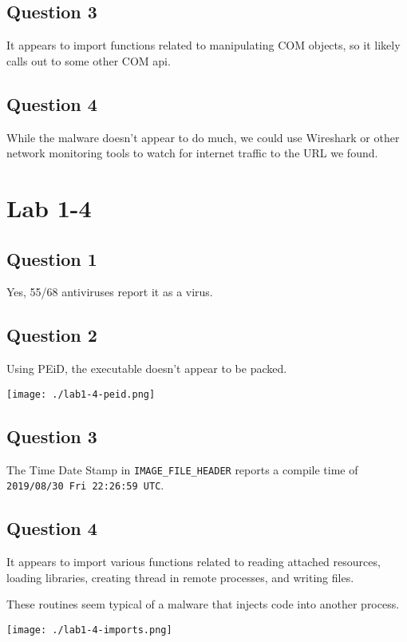 \documentclass[11pt]{article}
\begin{document}
\subsection{Question 3}
\label{sec:orgb028669}
It appears to import functions related to manipulating COM objects, so
it likely calls out to some other COM api.
\subsection{Question 4}
\label{sec:org6b0e262}
While the malware doesn't appear to do much, we could use Wireshark or
other network monitoring tools to watch for internet traffic to the
URL we found.
\section{Lab 1-4}
\label{sec:org75c0b34}
\subsection{Question 1}
\label{sec:org28dc5c8}
Yes, 55/68 antiviruses report it as a virus.
\subsection{Question 2}
\label{sec:orgc9357f0}
Using PEiD, the executable doesn't appear to be packed.

\begin{center}
\texttt{[image: ./lab1-4-peid.png]}
\end{center}
\subsection{Question 3}
\label{sec:orgc985e00}
The Time Date Stamp in \texttt{IMAGE\_FILE\_HEADER} reports a compile time of
\texttt{2019/08/30 Fri 22:26:59 UTC}.
\subsection{Question 4}
\label{sec:orga75e989}
It appears to import various functions related to reading attached
resources, loading libraries, creating thread in remote processes, and
writing files.

These routines seem typical of a malware that injects code into
another process.

\begin{center}
\texttt{[image: ./lab1-4-imports.png]}
\end{center}
\end{document}
